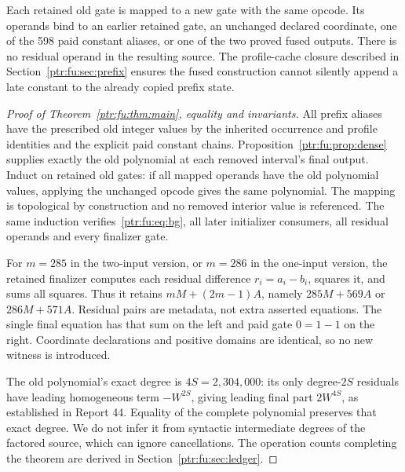 \documentclass[11pt,letterpaper]{article}
\theoremstyle{definition}\newtheorem{definition}[theorem]{Definition}
\theoremstyle{remark}\newtheorem{remark}[theorem]{Remark}
\newcommand{\code}[1]{\texttt{\detokenize{#1}}}
\begin{document}
Each retained old gate is mapped to a new gate with the same opcode. Its operands bind to an earlier retained gate, an unchanged declared coordinate, one of the 598 paid constant aliases, or one of the two proved fused outputs. There is no residual \code{C:} operand in the resulting source. The profile-cache closure described in Section~\ref{ptr:fu:sec:prefix} ensures the fused construction cannot silently append a late constant to the already copied prefix state.

\begin{proof}[Proof of Theorem~\ref{ptr:fu:thm:main}, equality and invariants]
All prefix aliases have the prescribed old integer values by the inherited occurrence and profile identities and the explicit paid constant chains. Proposition~\ref{ptr:fu:prop:dense} supplies exactly the old polynomial at each removed interval's final output. Induct on retained old gates: if all mapped operands have the old polynomial values, applying the unchanged opcode gives the same polynomial. The mapping is topological by construction and no removed interior value is referenced. The same induction verifies~\eqref{ptr:fu:eq:bg}, all later initializer consumers, all residual operands and every finalizer gate.

For $m=285$ in the two-input version, or $m=286$ in the one-input version, the retained finalizer computes each residual difference $r_i=a_i-b_i$, squares it, and sums all squares. Thus it retains $mM+(2m-1)A$, namely $285M+569A$ or $286M+571A$. Residual pairs are metadata, not extra asserted equations. The single final equation has that sum on the left and paid gate $0=1-1$ on the right. Coordinate declarations and positive domains are identical, so no new witness is introduced.

The old polynomial's exact degree is $4S=2,304,000$: its only degree-$2S$ residuals have leading homogeneous term $-W^{2S}$, giving leading final part $2W^{4S}$, as established in Report 44. Equality of the complete polynomial preserves that exact degree. We do not infer it from syntactic intermediate degrees of the factored source, which can ignore cancellations. The operation counts completing the theorem are derived in Section~\ref{ptr:fu:sec:ledger}.
\end{proof}
\end{document}
